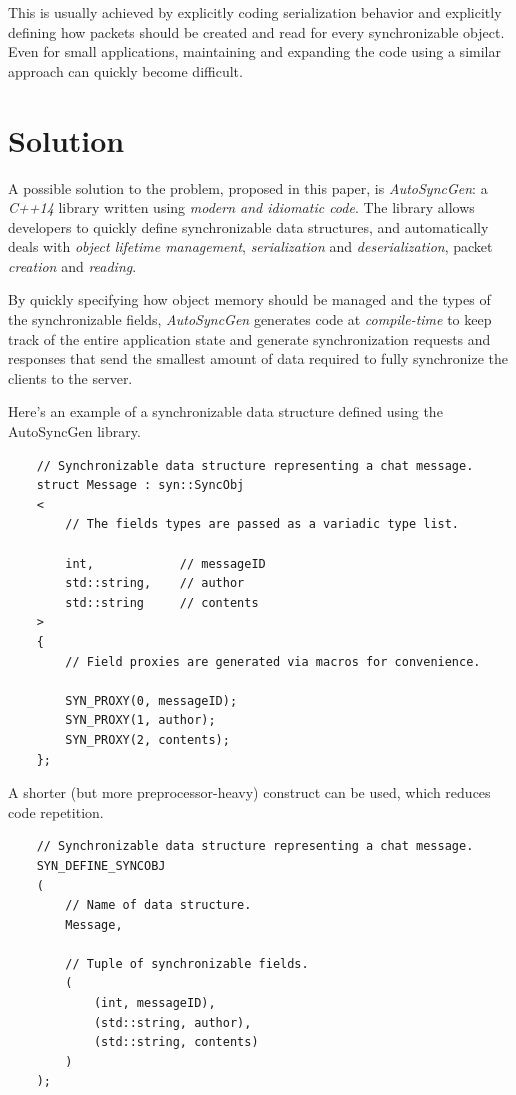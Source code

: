\documentclass{report}
\begin{document}
            This is usually achieved by explicitly coding serialization behavior and explicitly defining how packets should be created and read for every synchronizable object. Even for small applications, maintaining and expanding the code using a similar approach can quickly become difficult.

        \section{Solution}
            A possible solution to the problem, proposed in this paper, is \emph{AutoSyncGen}: a \emph{C++14} library written using \emph{modern and idiomatic code}.
            The library allows developers to quickly define synchronizable data structures, and automatically deals with \emph{object lifetime management}, \emph{serialization} and \emph{deserialization}, packet \emph{creation} and \emph{reading}.

            By quickly specifying how object memory should be managed and the types of the synchronizable fields, \emph{AutoSyncGen} generates code at \emph{compile-time} to keep track of the entire application state and generate synchronization requests and responses that send the smallest amount of data required to fully synchronize the clients to the server.

            \newpage

            Here's an example of a synchronizable data structure defined using the AutoSyncGen library.

            \begin{verbatim}
    // Synchronizable data structure representing a chat message.
    struct Message : syn::SyncObj
    <
        // The fields types are passed as a variadic type list.

        int,            // messageID
        std::string,    // author
        std::string     // contents
    >
    {
        // Field proxies are generated via macros for convenience.

        SYN_PROXY(0, messageID);
        SYN_PROXY(1, author);
        SYN_PROXY(2, contents);
    };
            \end{verbatim}

            A shorter (but more preprocessor-heavy) construct can be used, which reduces code repetition.

            \begin{verbatim}
    // Synchronizable data structure representing a chat message.
    SYN_DEFINE_SYNCOBJ
    (
        // Name of data structure.
        Message,

        // Tuple of synchronizable fields.
        (
            (int, messageID),
            (std::string, author),
            (std::string, contents)
        )
    );
            \end{verbatim}
\end{document}

